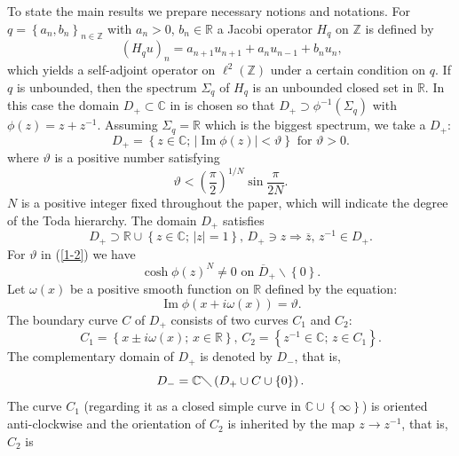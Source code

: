 \documentclass[a4paper]{article}%
\begin{document}
To state the main results we prepare necessary notions and notations. For
$q=\left\{  a_{n},b_{n}\right\}  _{n\in\mathbb{Z}}$ with $a_{n}>0$, $b_{n}%
\in\mathbb{R}$ a Jacobi operator $H_{q}$ on $\mathbb{Z}$ is defined by%
\[
\left(  H_{q}u\right)  _{n}=a_{n+1}u_{n+1}+a_{n}u_{n-1}+b_{n}u_{n}\text{,}%
\]
which yields a self-adjoint operator on $\ell^{2}\left(  \mathbb{Z}\right)  $
under a certain condition on $q$. If $q$ is unbounded, then the spectrum
$\Sigma_{q}$ of $H_{q}$ is an unbounded closed set in $\mathbb{R}$. In this
case the domain $D_{+}\subset\mathbb{C}$ in \cite{z} is chosen so that
$D_{+}\supset\phi^{-1}\left(  \Sigma_{q}\right)  $ with $\phi\left(  z\right)
=z+z^{-1}$. Assuming $\Sigma_{q}=\mathbb{R}$ which is the biggest spectrum, we
take a $D_{+}$:%
\[
D_{+}=\left\{  z\in\mathbb{C}\text{; \ }\left\vert \operatorname{Im}%
\phi\left(  z\right)  \right\vert <\vartheta\right\}  \text{ \ for }%
\vartheta>0\text{.}%
\]
where $\vartheta$ is a positive number satisfying%
\begin{equation}
\vartheta<\left(  \dfrac{\pi}{2}\right)  ^{1/N}\sin\dfrac{\pi}{2N}%
\text{.}\label{1-2}%
\end{equation}
$N$ is a positive integer fixed throughout the paper, which will indicate the
degree of the Toda hierarchy. The domain $D_{+}$ satisfies%
\[
D_{+}\supset\mathbb{R}\cup\left\{  z\in\mathbb{C}\text{; }\left\vert
z\right\vert =1\right\}  \text{, \ \ }D_{+}\ni z\Longrightarrow\overline
{z}\text{, \ }z^{-1}\in D_{+}\text{.}%
\]
For $\vartheta$ in (\ref{1-2}) we have%
\begin{equation}
\cosh\phi\left(  z\right)  ^{N}\neq0\text{ \ on }\overline{D}_{+}%
\backslash\left\{  0\right\}  \text{.}\label{1-3}%
\end{equation}
Let $\omega\left(  x\right)  $ be a positive smooth function on $\mathbb{R}$
defined by the equation:%
\[
\operatorname{Im}\phi\left(  x+i\omega\left(  x\right)  \right)
=\vartheta\text{.}%
\]
The boundary curve $C$ of $D_{+}$ consists of two curves $C_{1}$ and $C_{2}$:%
\[
C_{1}=\left\{  x\pm i\omega\left(  x\right)  \text{; \ }x\in\mathbb{R}%
\right\}  \text{, \ }C_{2}=\left\{  z^{-1}\in\mathbb{C}\text{; \ }z\in
C_{1}\right\}  \text{.}%
\]
The complementary domain of $D_{+}$ is denoted by $D_{-}$, that is,
\[
D_{-}=\mathbb{C}\diagdown\left(  D_{+}\cup C\cup\left\{  0\right\}  \right)
\text{.}%
\]
The curve $C_{1}$ (regarding it as a closed simple curve in $\mathbb{C}%
\cup\left\{  \infty\right\}  $) is oriented anti-clockwise and the orientation
of $C_{2}$ is inherited by the map $z\rightarrow z^{-1}$, that is, $C_{2}$ is
\end{document}
